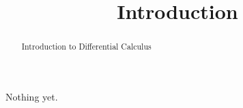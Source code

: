 \documentclass{ximera}
\title{Introduction}
\begin{document}
\begin{abstract}
Introduction to Differential Calculus
\end{abstract}
\maketitle


Nothing yet.
\end{document}
